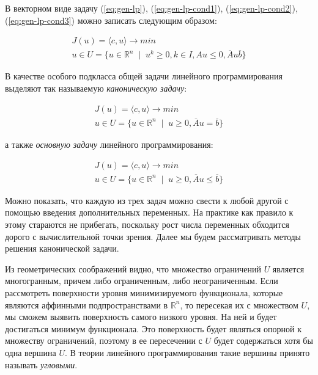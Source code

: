 \documentclass[a4paper, 12pt, titlepage]{article}
\theoremstyle{definition}
\theoremstyle{plain}
\theoremstyle{plain}
\begin{document}
В векторном виде задачу (\ref{eq:gen-lp}), (\ref{eq:gen-lp-cond1}),
(\ref{eq:gen-lp-cond2}), (\ref{eq:gen-lp-cond3}) можно записать следующим
образом:

\begin{equation}
 \begin{aligned}
  J(u) = \langle c, u \rangle \to min \\
  u \in U = \{u \in \mathbb{R}^{n} \;\; | \;\; u^{k} \geq 0, k \in I,
  A u \leq 0, \overline{A} u \overline{b}\}
 \end{aligned}
\end{equation}

В качестве особого подкласса общей задачи линейного программирования
выделяют так называемую \textit{каноническую задачу}:

\begin{equation}
 \begin{aligned}
  J(u) = \langle c, u \rangle \to min \\
  u \in U = \{u \in \mathbb{R}^{n} \;\; | \;\; u \geq 0,
  \overline{A} u = \overline{b}\}
 \end{aligned}
\end{equation}

а также \textit{основную задачу} линейного программирования:

\begin{equation}
 \begin{aligned}
  J(u) = \langle c, u \rangle \to min \\
  u \in U = \{u \in \mathbb{R}^{n} \;\; | \;\; u \geq 0,
  \overline{A} u \leq \overline{b}\}
 \end{aligned}
\end{equation}

Можно показать, что каждую из трех задач можно свести к любой другой с помощью
введения дополнительных переменных. На практике как правило к этому стараются
не прибегать, поскольку рост числа переменных обходится дорого с вычислительной 
точки зрения. Далее мы будем рассматривать методы решения канонической задачи.

Из геометрических соображений видно, что множество ограничений $U$ является
многогранным, причем либо ограниченным, либо неограниченным. Если рассмотреть
поверхности уровня минимизируемого функционала, которые являются аффинными
подпространствами в $\mathbb{R}^{n}$, то пересекая их с множеством $U$, мы
сможем выявить поверхность самого низкого уровня. На ней и будет достигаться
минимум функционала. Это поверхность будет являться опорной к множеству
ограничений, поэтому в ее пересечении с $U$ будет содержаться хотя бы одна 
вершина $U$. В теории линейного программирования такие вершины принято
называть \textit{угловыми}.
\end{document}
